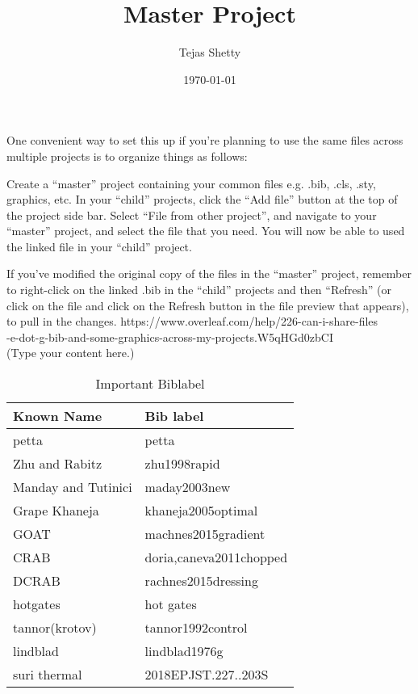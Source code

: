 \documentclass{article}
\begin{document}
\title{Master Project}
\author{Tejas Shetty}
\date{\today} %
\maketitle
One convenient way to set this up if you're planning to use the same files across multiple projects is to organize things as follows:

Create a “master” project containing your common files e.g. .bib, .cls, .sty, graphics, etc.
In your “child” projects, click the “Add file” button at the top of the project side bar.
Select “File from other project”, and navigate to your “master” project, and select the file that you need.
You will now be able to used the linked file in your “child” project.

If you’ve modified the original copy of the files in the “master” project, remember to right-click on the linked .bib in the “child” projects and then “Refresh” (or click on the file and click on the Refresh button in the file preview that appears), to pull in the changes.
\cite{maday2003new}
{https://www.overleaf.com/help/226-can-i-share-files\\
-e-dot-g-bib-and-some-graphics-across-my-projects.W5qHGd0zbCI}\\
(Type your content here.)




\begin{table}[!ht]
\centering
\begin{tabular}{l|l}
Known Name & Bib label \\\hline
petta & petta \\
Zhu and Rabitz & zhu1998rapid\\
Manday and Tutinici & maday2003new\\
Grape Khaneja & khaneja2005optimal\\
GOAT & machnes2015gradient\\
CRAB & doria,caneva2011chopped\\
DCRAB & rachnes2015dressing\\
hotgates & hot gates\\
tannor(krotov) & tannor1992control\\
lindblad & lindblad1976g\\
suri thermal & 2018EPJST.227..203S
\end{tabular}
\caption{\label{tab:Important  Biblabel}Important  Biblabel}
\end{table}
\end{document}
